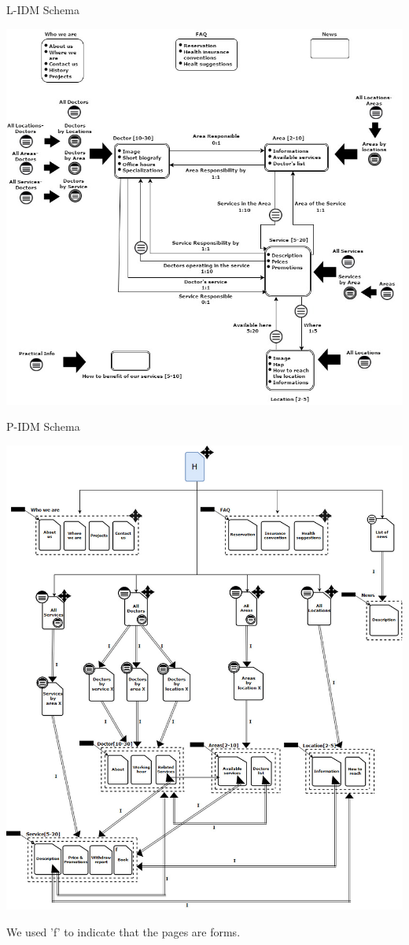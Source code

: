 \documentclass{../Common/Structure/doc_pdf}
\begin{document}
{\centering 
L-IDM Schema
\vspace{1cm}
\begin{center}
	\includegraphics[width=\textwidth]{Clinic_L_IDM.jpg}
\end{center}}

\newpage

{\centering 
P-IDM Schema
\vspace{1cm}
\begin{center}
	\includegraphics[width=\textwidth]{Clinic_P_IDM.jpg}
\end{center}}
\vspace{0.5cm}
We used 'f' to indicate that the pages are forms.
\end{document}
